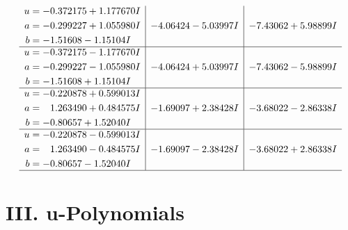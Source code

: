 \documentclass[1p]{elsarticle_modified}
\theoremstyle{definition}
\begin{document}
$$\begin{array}{c|c|c}
\begin{aligned}
u &= -0.372175 + 1.177670 I \\
a &= -0.299227 + 1.055980 I \\
b &= -1.51608 - 1.15104 I\end{aligned}
 & -4.06424 - 5.03997 I & -7.43062 + 5.98899 I \\ \hline\begin{aligned}
u &= -0.372175 - 1.177670 I \\
a &= -0.299227 - 1.055980 I \\
b &= -1.51608 + 1.15104 I\end{aligned}
 & -4.06424 + 5.03997 I & -7.43062 - 5.98899 I \\ \hline\begin{aligned}
u &= -0.220878 + 0.599013 I \\
a &= \phantom{-}1.263490 + 0.484575 I \\
b &= -0.80657 + 1.52040 I\end{aligned}
 & -1.69097 + 2.38428 I & -3.68022 - 2.86338 I \\ \hline\begin{aligned}
u &= -0.220878 - 0.599013 I \\
a &= \phantom{-}1.263490 - 0.484575 I \\
b &= -0.80657 - 1.52040 I\end{aligned}
 & -1.69097 - 2.38428 I & -3.68022 + 2.86338 I\\
 \hline 
 \end{array}$$\newpage
\newpage\renewcommand{\arraystretch}{1}
\centering \section*{ III. u-Polynomials}
\end{document}
